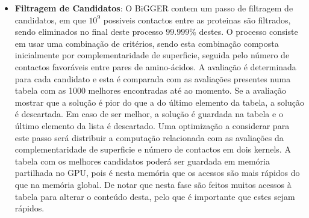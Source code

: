 \begin{itemize}
\item{\textbf{Filtragem de Candidatos}}: O BiGGER contem um passo de filtragem de candidatos, em que $10^{9}$ possiveis contactos entre as proteinas são filtrados, sendo eliminados no final deste processo $99.999\%$ destes. O processo consiste em usar uma combinação de critérios, sendo esta combinação composta inicialmente por complementaridade de superficie, seguida pelo número de contactos favoráveis entre pares de amino-ácidos. A avaliação é determinada para cada candidato e esta é comparada com as avaliações presentes numa tabela com as 1000 melhores encontradas até ao momento. Se a avaliação mostrar que a solução é pior do que a do último elemento da tabela, a solução é descartada. Em caso de ser melhor, a solução é guardada na tabela e o último elemento da lista é descartado. Uma optimização a considerar para este passo será distribuir a computação relacionada com as avaliações da complementaridade de superficie e número de contactos em dois kernels. A tabela com os melhores candidatos poderá ser guardada em memória partilhada no GPU, pois é nesta memória que os acessos são mais rápidos do que na memória global. De notar que nesta fase são feitos muitos acessos à tabela para alterar o conteúdo desta, pelo que é importante que estes sejam rápidos.

\end{itemize}
